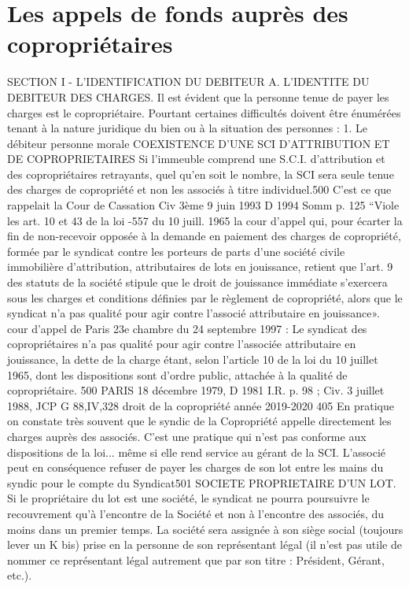 \chapter{Les appels de fonds auprès des copropriétaires}

SECTION I - L’IDENTIFICATION DU DEBITEUR
A. L’IDENTITE DU DEBITEUR DES CHARGES.
Il est évident que la personne tenue de payer les charges est le copropriétaire. Pourtant certaines difficultés doivent être énumérées tenant à la nature juridique du bien ou à la situation des personnes :
1. Le débiteur personne morale
COEXISTENCE D'UNE SCI D'ATTRIBUTION ET DE COPROPRIETAIRES
Si l'immeuble comprend une S.C.I. d'attribution et des copropriétaires retrayants, quel qu'en soit le nombre, la SCI sera seule tenue des charges de copropriété et non les associés à titre individuel.500
C’est ce que rappelait la Cour de Cassation Civ 3ème 9 juin 1993 D 1994 Somm p. 125
“Viole les art. 10 et 43 de la loi -557 du 10 juill. 1965 la cour d'appel qui, pour écarter la fin de non-recevoir opposée à la demande en paiement des charges de copropriété, formée par le syndicat contre les porteurs de parts d'une société civile immobilière d'attribution, attributaires de lots en jouissance, retient que l'art. 9 des statuts de la société stipule que le droit de jouissance immédiate s'exercera sous les charges et conditions définies par le règlement de copropriété, alors que le syndicat n'a pas qualité pour agir contre l'associé attributaire en jouissance».
cour d'appel de Paris 23e chambre du 24 septembre 1997 :
Le syndicat des copropriétaires n'a pas qualité pour agir contre l'associée attributaire en jouissance, la dette de la charge étant, selon l'article 10 de la loi du 10 juillet 1965, dont les dispositions sont d'ordre public, attachée à la qualité de copropriétaire.
500 PARIS 18 décembre 1979, D 1981 I.R. p. 98 ; Civ. 3 juillet 1988, JCP G 88,IV,328
droit de la copropriété année 2019-2020
405
En pratique on constate très souvent que le syndic de la Copropriété appelle directement les charges auprès des associés. C'est une pratique qui n'est pas conforme aux dispositions de la loi... même si elle rend service au gérant de la SCI. L'associé peut en conséquence refuser de payer les charges de son lot entre les mains du syndic pour le compte du Syndicat501
SOCIETE PROPRIETAIRE D’UN LOT.
Si le propriétaire du lot est une société, le syndicat ne pourra poursuivre le recouvrement qu’à l’encontre de la Société et non à l’encontre des associés, du moins dans un premier temps.
La société sera assignée à son siège social (toujours lever un K bis) prise en la personne de son représentant légal (il n’est pas utile de nommer ce représentant légal autrement que par son titre : Président, Gérant, etc.).

